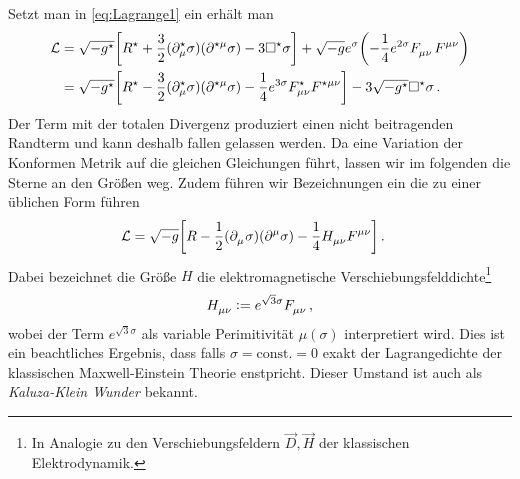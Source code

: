 Setzt man in \eqref{eq:Lagrange1} ein erhält man
\begin{equation}
\begin{split}
\mathcal{L}&=\sqrt{-g^\star}\left[R^\star
+\frac{3}{2}(\tensor*{\partial}{^\star_\mu}\sigma)(\tensor{\partial}{^\star^\mu}\sigma)
-3\square^\star\sigma\right]
+\sqrt{-g}e^{\sigma}\left(-\frac{1}{4}e^{2\sigma}\tensor{F}{_\mu_\nu}\tensor{F}{^\mu^\nu}\right)\\
&=\sqrt{-g^\star}\left[R^\star
-\frac{3}{2}(\tensor*{\partial}{^\star_\mu}\sigma)(\tensor{\partial}{^\star^\mu}\sigma)
-\frac{1}{4}e^{3\sigma}\tensor*{F}{^\star_\mu_\nu}\tensor*{F}{^\star^\mu^\nu}\right]-3\sqrt{-g^\star}\square^\star\sigma\,.
\end{split}
\end{equation}
Der Term mit der totalen Divergenz produziert einen nicht beitragenden Randterm
und kann deshalb fallen gelassen werden. 
Da eine Variation der Konformen Metrik auf die
gleichen Gleichungen führt, lassen wir im folgenden die Sterne an den Größen weg. Zudem führen wir
Bezeichnungen ein die zu einer üblichen Form führen
\begin{equation}
\begin{split}
\mathcal{L}
&=\sqrt{-g}\left[R
-\frac{1}{2}(\tensor{\partial}{_\mu}\sigma)(\tensor{\partial}{^\mu}\sigma)
-\frac{1}{4}\tensor*{H}{_\mu_\nu}\tensor*{F}{^\mu^\nu}\right]\,.
\label{eq:Lagrange2}
\end{split}
\end{equation}
Dabei bezeichnet die
Größe $H$ die elektromagnetische Verschiebungsfelddichte\footnote{In Analogie zu
den Verschiebungsfeldern $\vec{D},\vec{H}$ der klassischen Elektrodynamik.
}
\begin{equation}
\tensor*{H}{_\mu_\nu}:=e^{\sqrt{3}\sigma}\tensor*{F}{_\mu_\nu}\,,
\end{equation}
wobei der Term $e^{\sqrt{3}\sigma}$ als variable Perimitivität $\mu(\sigma)$
interpretiert wird. Dies ist ein beachtliches Ergebnis, dass falls
$\sigma=\text{const.}=0$ exakt der Lagrangedichte der klassischen
Maxwell-Einstein Theorie enstpricht. Dieser Umstand ist auch als
\emph{Kaluza-Klein Wunder} bekannt.
